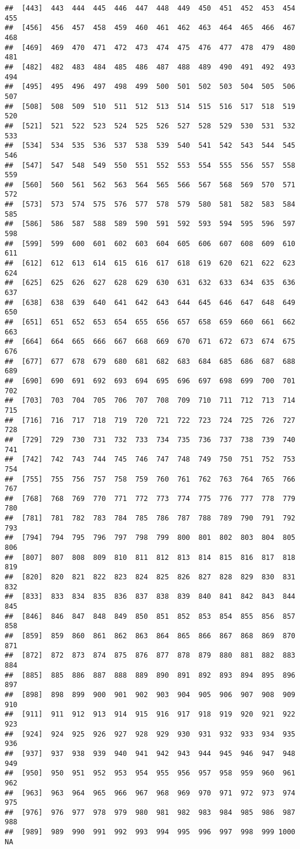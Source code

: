 \documentclass[]{article}
\begin{document}
\begin{verbatim}
##  [443]  443  444  445  446  447  448  449  450  451  452  453  454  455
##  [456]  456  457  458  459  460  461  462  463  464  465  466  467  468
##  [469]  469  470  471  472  473  474  475  476  477  478  479  480  481
##  [482]  482  483  484  485  486  487  488  489  490  491  492  493  494
##  [495]  495  496  497  498  499  500  501  502  503  504  505  506  507
##  [508]  508  509  510  511  512  513  514  515  516  517  518  519  520
##  [521]  521  522  523  524  525  526  527  528  529  530  531  532  533
##  [534]  534  535  536  537  538  539  540  541  542  543  544  545  546
##  [547]  547  548  549  550  551  552  553  554  555  556  557  558  559
##  [560]  560  561  562  563  564  565  566  567  568  569  570  571  572
##  [573]  573  574  575  576  577  578  579  580  581  582  583  584  585
##  [586]  586  587  588  589  590  591  592  593  594  595  596  597  598
##  [599]  599  600  601  602  603  604  605  606  607  608  609  610  611
##  [612]  612  613  614  615  616  617  618  619  620  621  622  623  624
##  [625]  625  626  627  628  629  630  631  632  633  634  635  636  637
##  [638]  638  639  640  641  642  643  644  645  646  647  648  649  650
##  [651]  651  652  653  654  655  656  657  658  659  660  661  662  663
##  [664]  664  665  666  667  668  669  670  671  672  673  674  675  676
##  [677]  677  678  679  680  681  682  683  684  685  686  687  688  689
##  [690]  690  691  692  693  694  695  696  697  698  699  700  701  702
##  [703]  703  704  705  706  707  708  709  710  711  712  713  714  715
##  [716]  716  717  718  719  720  721  722  723  724  725  726  727  728
##  [729]  729  730  731  732  733  734  735  736  737  738  739  740  741
##  [742]  742  743  744  745  746  747  748  749  750  751  752  753  754
##  [755]  755  756  757  758  759  760  761  762  763  764  765  766  767
##  [768]  768  769  770  771  772  773  774  775  776  777  778  779  780
##  [781]  781  782  783  784  785  786  787  788  789  790  791  792  793
##  [794]  794  795  796  797  798  799  800  801  802  803  804  805  806
##  [807]  807  808  809  810  811  812  813  814  815  816  817  818  819
##  [820]  820  821  822  823  824  825  826  827  828  829  830  831  832
##  [833]  833  834  835  836  837  838  839  840  841  842  843  844  845
##  [846]  846  847  848  849  850  851  852  853  854  855  856  857  858
##  [859]  859  860  861  862  863  864  865  866  867  868  869  870  871
##  [872]  872  873  874  875  876  877  878  879  880  881  882  883  884
##  [885]  885  886  887  888  889  890  891  892  893  894  895  896  897
##  [898]  898  899  900  901  902  903  904  905  906  907  908  909  910
##  [911]  911  912  913  914  915  916  917  918  919  920  921  922  923
##  [924]  924  925  926  927  928  929  930  931  932  933  934  935  936
##  [937]  937  938  939  940  941  942  943  944  945  946  947  948  949
##  [950]  950  951  952  953  954  955  956  957  958  959  960  961  962
##  [963]  963  964  965  966  967  968  969  970  971  972  973  974  975
##  [976]  976  977  978  979  980  981  982  983  984  985  986  987  988
##  [989]  989  990  991  992  993  994  995  996  997  998  999 1000   NA
\end{verbatim}
\end{document}
